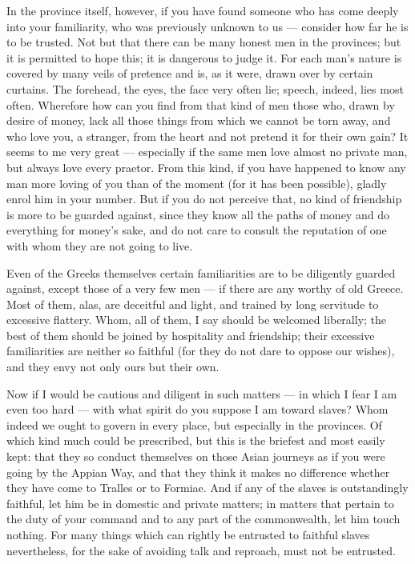  In the province itself, however, if you have found someone who has come deeply into your familiarity, who was previously unknown to us --- consider how far he is to be trusted. Not but that there can be many honest men in the provinces; but it is permitted to hope this; it is dangerous to judge it. For each man's nature is covered by many veils of pretence and is, as it were, drawn over by certain curtains. The forehead, the eyes, the face very often lie; speech, indeed, lies most often. Wherefore how can you find from that kind of men those who, drawn by desire of money, lack all those things from which we cannot be torn away, and who love you, a stranger, from the heart and not pretend it for their own gain? It seems to me very great --- especially if the same men love almost no private man, but always love every praetor. From this kind, if you have happened to know any man more loving of you than of the moment (for it has been possible), gladly enrol him in your number. But if you do not perceive that, no kind of friendship is more to be guarded against, since they know all the paths of money and do everything for money's sake, and do not care to consult the reputation of one with whom they are not going to live.

 Even of the Greeks themselves certain familiarities are to be diligently guarded against, except those of a very few men --- if there are any worthy of old Greece. Most of them, alas, are deceitful and light, and trained by long servitude to excessive flattery. Whom, all of them, I say should be welcomed liberally; the best of them should be joined by hospitality and friendship; their excessive familiarities are neither so faithful (for they do not dare to oppose our wishes), and they envy not only ours but their own.

 Now if I would be cautious and diligent in such matters --- in which I fear I am even too hard --- with what spirit do you suppose I am toward slaves? Whom indeed we ought to govern in every place, but especially in the provinces. Of which kind much could be prescribed, but this is the briefest and most easily kept: that they so conduct themselves on those Asian journeys as if you were going by the Appian Way, and that they think it makes no difference whether they have come to Tralles or to Formiae. And if any of the slaves is outstandingly faithful, let him be in domestic and private matters; in matters that pertain to the duty of your command and to any part of the commonwealth, let him touch nothing. For many things which can rightly be entrusted to faithful slaves nevertheless, for the sake of avoiding talk and reproach, must not be entrusted.

